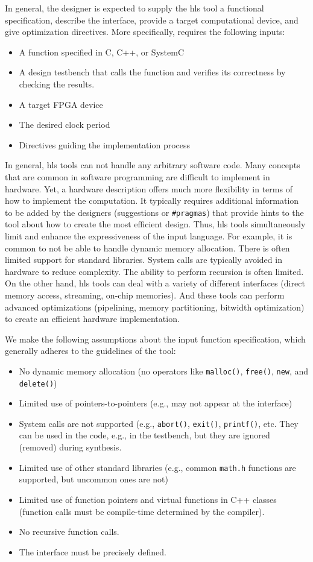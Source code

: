In general, the designer is expected to supply the \gls{hls} tool a functional specification, describe the interface, provide a target computational device, and give optimization directives. More specifically, \VHLS requires the following inputs:
\begin{itemize}
\item A function specified in C, C++, or SystemC 
\item A design testbench that calls the function and verifies its correctness by checking the results.
\item A target FPGA device
\item The desired clock period
\item Directives guiding the implementation process
\end{itemize}

In general, \gls{hls} tools can not handle any arbitrary software code. Many concepts that are common in software programming are difficult to implement in hardware. Yet, a hardware description offers much more flexibility in terms of how to implement the computation. It typically requires additional information to be added by the designers (suggestions or \lstinline|#pragmas|) that provide hints to the tool about how to create the most efficient design. Thus, \gls{hls} tools simultaneously limit and enhance the expressiveness of the input language. For example, it is common to not be able to handle dynamic memory allocation. There is often limited support for standard libraries. System calls are typically avoided in hardware to reduce complexity. The ability to perform recursion is often limited. On the other hand, \gls{hls} tools can deal with a variety of different interfaces (direct memory access, streaming, on-chip memories). And these tools can perform advanced optimizations (pipelining, memory partitioning, bitwidth optimization) to create an efficient hardware implementation. 

We make the following assumptions about the input function specification, which generally adheres to the guidelines of the \VHLS tool:
\begin{itemize}
\item No dynamic memory allocation (no operators like \lstinline|malloc()|, \lstinline|free()|, \lstinline|new|, and \lstinline|delete()|)
\item Limited use of pointers-to-pointers (e.g., may not appear at the interface)
\item System calls are not supported (e.g., \lstinline|abort()|, \lstinline|exit()|, \lstinline|printf()|, etc. They can be used in the code, e.g., in the testbench, but they are ignored (removed) during synthesis.
\item Limited use of other standard libraries (e.g., common \lstinline|math.h| functions are supported, but uncommon ones are not)
\item Limited use of function pointers and virtual functions in C++ classes (function calls must be compile-time determined by the compiler).
\item No recursive function calls.
\item The interface must be precisely defined.
\end{itemize}

